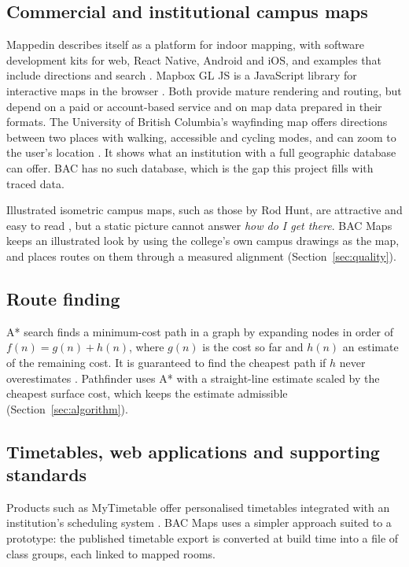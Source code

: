 \documentclass[12pt,a4paper]{report}
\begin{document}
\subsection{Commercial and institutional campus maps}
Mappedin describes itself as a platform for indoor mapping, with software development kits for web, React Native, Android and iOS, and examples that include directions and search \citep{mappedin2026}. Mapbox GL JS is a JavaScript library for interactive maps in the browser \citep{mapbox2026}. Both provide mature rendering and routing, but depend on a paid or account-based service and on map data prepared in their formats. The University of British Columbia's wayfinding map offers directions between two places with walking, accessible and cycling modes, and can zoom to the user's location \citep{ubc2026}. It shows what an institution with a full geographic database can offer. BAC has no such database, which is the gap this project fills with traced data.

Illustrated isometric campus maps, such as those by Rod Hunt, are attractive and easy to read \citep{hunt2026}, but a static picture cannot answer \emph{how do I get there}. BAC Maps keeps an illustrated look by using the college's own campus drawings as the map, and places routes on them through a measured alignment (Section~\ref{sec:quality}).

\subsection{Route finding}
A* search finds a minimum-cost path in a graph by expanding nodes in order of $f(n)=g(n)+h(n)$, where $g(n)$ is the cost so far and $h(n)$ an estimate of the remaining cost. It is guaranteed to find the cheapest path if $h$ never overestimates \citep{hart1968}. Pathfinder uses A* with a straight-line estimate scaled by the cheapest surface cost, which keeps the estimate admissible (Section~\ref{sec:algorithm}).

\subsection{Timetables, web applications and supporting standards}
Products such as MyTimetable offer personalised timetables integrated with an institution's scheduling system \citep{mytimetable2026}. BAC Maps uses a simpler approach suited to a prototype: the published timetable export is converted at build time into a file of class groups, each linked to mapped rooms.
\end{document}
